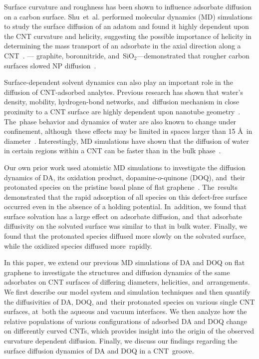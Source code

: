 \documentclass[molecules,article,accept,pdftex,moreauthors]{Definitions/mdpi}
\begin{document}
Surface curvature and roughness has been shown to influence adsorbate diffusion on a carbon surface. Shu~et~al. performed molecular dynamics (MD) simulations to study the surface diffusion of an adatom and found it highly dependent upon the CNT curvature and helicity, suggesting the possible importance of helicity in determining the mass transport of an adsorbate in the axial direction along a CNT~\cite{Shu2001}. 
---%
graphite, boronnitride, and~SiO$_2$---demonstrated that rougher carbon surfaces slowed NP diffusion~\cite{Liu2013}.

Surface-dependent solvent dynamics can also play an important role in the diffusion of CNT-adsorbed analytes. Previous research has shown that water's density, mobility, hydrogen-bond networks, and~diffusion mechanism in close proximity to a CNT surface are highly dependent upon nanotube geometry~\cite{Farimani2011, Alexiadis2008, Zheng2012}. The~phase behavior and dynamics of water are also known to change under confinement, although~these effects may be limited in spaces larger than 15 \AA\ in diameter~\cite{Zheng2012, Hirunsit2007, Limmer2012}. Interestingly, MD simulations have shown that the diffusion of water in certain regions within a CNT can be faster than in the bulk phase~\cite{Farimani2011, Striolo2006, Falk2010}. 

Our own prior work used atomistic MD simulations to investigate the diffusion dynamics of DA, its oxidation product, dopamine-$o$-quinone (DOQ), and~their protonated species on the pristine basal plane of flat graphene~\cite{Jia2022}. The~results demonstrated that the rapid adsorption of all species on this defect-free surface occurred even in the absence of a holding potential. In~addition, we found that surface solvation has a large effect on adsorbate diffusion, and~that adsorbate diffusivity on the solvated surface was similar to that in bulk water. Finally, we found that the protonated species diffused more slowly on the solvated surface, while the oxidized species diffused more~rapidly.

In this paper, we extend our previous MD simulations of DA and DOQ on flat graphene to investigate the structures and diffusion dynamics of the same adsorbates on CNT surfaces of differing diameters, helicities, and~arrangements. We first describe our model system and simulation techniques and then quantify the diffusivities of DA, DOQ, and~their protonated species on various single CNT surfaces, at~both the aqueous and vacuum interfaces. We then analyze how the relative populations of various configurations of adsorbed DA and DOQ change on differently curved CNTs, which provides insight into the origin of the observed curvature dependent diffusion. Finally, we discuss our findings regarding the surface diffusion dynamics of DA and DOQ in a CNT~groove.
\newpage
\end{document}
